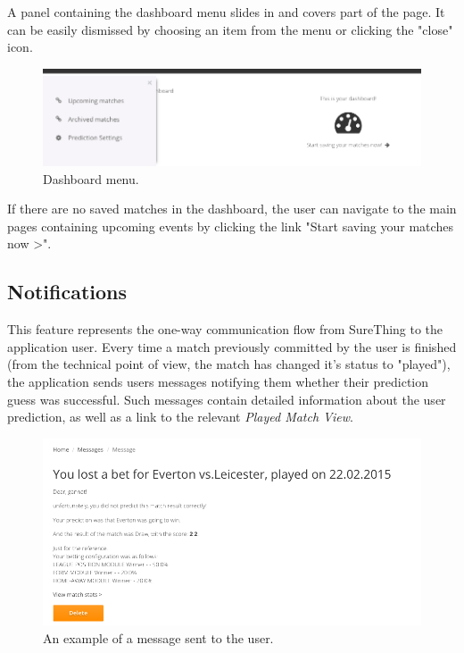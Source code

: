 A panel containing the dashboard menu slides in and covers part of the page. It can be easily dismissed by choosing an item from the menu or clicking the "close" icon.

\begin{figure}[H]
	\begin{center}
		\includegraphics[width=.90\textwidth]{impl/images/dashboardMenu}
		\caption{Dashboard menu.} \label{fig:using: dashboardmenu}
	\end{center}
\end{figure}

If there are no saved matches in the dashboard, the user can navigate to the main pages containing upcoming events by clicking the link "Start saving your matches now >".

\subsection{Notifications}
\label{subsec:notifications}
This feature represents the one-way communication flow from SureThing to the application user. Every time a match previously committed by the user is finished (from the technical point of view, the match has changed it’s status to "played"), the application sends users messages notifying them whether their prediction guess was successful. Such messages contain detailed information about the user prediction, as well as a link to the relevant \emph{Played Match View}.

\begin{figure}[H]
	\begin{center}
		\includegraphics[width=.90\textwidth]{impl/images/message}
		\caption{An example of a message sent to the user.} \label{fig:using: message}
	\end{center}
\end{figure}

